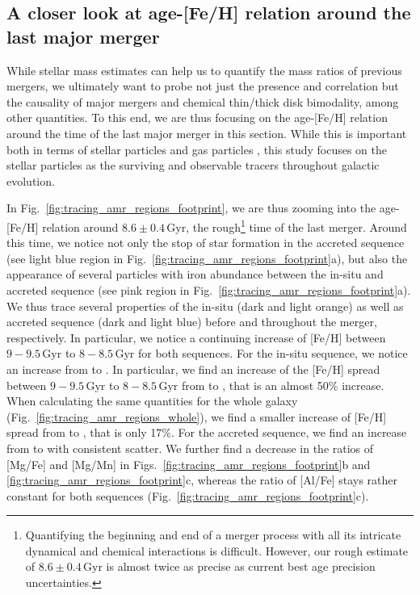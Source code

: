 \documentclass[fleqn,usenatbib]{mnras}
\begin{document}
\subsection{A closer look at age-[Fe/H] relation around the last major merger} \label{sec:discussion_zoom_at_mergertime}

While stellar mass estimates can help us to quantify the mass ratios of previous mergers, we ultimately want to probe not just the presence and correlation but the causality of major mergers and chemical thin/thick disk bimodality, among other quantities. To this end, we are thus focusing on the age-[Fe/H] relation around the time of the last major merger in this section. While this is important both in terms of stellar particles and gas particles \citep[see e.g. the study by][]{Buck2023}, this study focuses on the stellar particles as the surviving and observable tracers throughout galactic evolution.

In Fig.~\ref{fig:tracing_amr_regions_footprint}, we are thus zooming into the age-[Fe/H] relation around $8.6\pm0.4\,\mathrm{Gyr}$, the rough\footnote{Quantifying the beginning and end of a merger process with all its intricate dynamical and chemical interactions is difficult. However, our rough estimate of $8.6\pm0.4\,\mathrm{Gyr}$ is almost twice as precise as current best age precision uncertainties.} time of the last merger. Around this time, we notice not only the stop of star formation in the accreted sequence (see light blue region in Fig.~\ref{fig:tracing_amr_regions_footprint}a), but also the appearance of several particles with iron abundance between the in-situ and accreted sequence (see pink region in Fig.~\ref{fig:tracing_amr_regions_footprint}a). We thus trace several properties of the in-situ (dark and light orange) as well as accreted sequence (dark and light blue) before and throughout the merger, respectively. In particular, we notice a continuing increase of [Fe/H] between $9-9.5\,\mathrm{Gyr}$ to $8-8.5\,\mathrm{Gyr}$ for both sequences. For the in-situ sequence, we notice an increase from  to . In particular, we find an increase of the [Fe/H] spread between $9-9.5\,\mathrm{Gyr}$ to $8-8.5\,\mathrm{Gyr}$ from 
 to , that is an almost 50\% increase. When calculating the same quantities for the whole galaxy (Fig.~\ref{fig:tracing_amr_regions_whole}), we find a smaller increase of [Fe/H] spread from  to , that is only 17\%. For the accreted sequence, we find an increase from  to  with consistent scatter. We further find a decrease in the ratios of [Mg/Fe] and [Mg/Mn] in Figs.~\ref{fig:tracing_amr_regions_footprint}b and \ref{fig:tracing_amr_regions_footprint}c, whereas the ratio of [Al/Fe] stays rather constant for both sequences (Fig.~\ref{fig:tracing_amr_regions_footprint}c).
\end{document}
